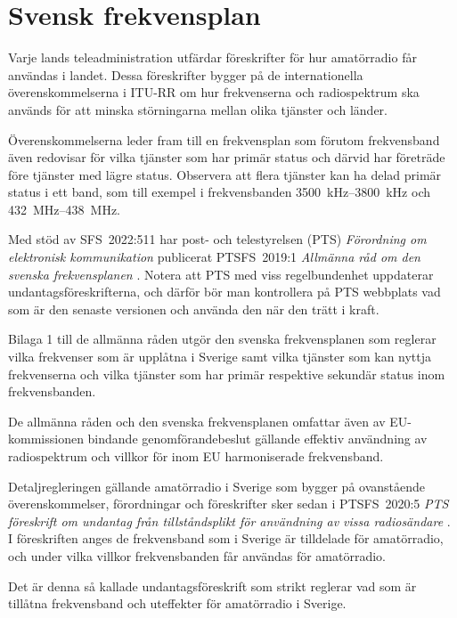 \chapter{Svensk frekvensplan}
\label{svensk frekvensplan}

Varje lands teleadministration utfärdar föreskrifter för hur amatörradio får
användas i landet.
Dessa föreskrifter bygger på de internationella överenskommelserna i ITU-RR
\cite[ARTICLE 5]{ITU-RR} om hur frekvenserna och radiospektrum ska används för
att minska störningarna mellan olika tjänster och länder.

Överenskommelserna leder fram till en frekvensplan som förutom frekvensband även
redovisar för vilka tjänster som har primär status och därvid har företräde före
tjänster med lägre status.
Observera att flera tjänster kan ha delad primär status i ett band, som till
exempel i frekvensbanden \SIrange{3500}{3800}{\kilo\hertz} och
\SIrange{432}{438}{\mega\hertz}.

Med stöd av SFS~2022:511 har post- och telestyrelsen (PTS)
\emph{Förordning om elektronisk kommunikation} \cite{SFS2022:511}
publicerat PTSFS~2019:1 \emph{Allmänna råd om den svenska frekvensplanen}
\cite{PTSFS2019:1}.
Notera att PTS med viss regelbundenhet uppdaterar undantagsföreskrifterna,
och därför bör man kontrollera på PTS webbplats vad som är den senaste versionen
och använda den när den trätt i kraft.

Bilaga 1 till de allmänna råden utgör den svenska frekvensplanen som reglerar
vilka frekvenser som är upplåtna i Sverige samt vilka tjänster som kan nyttja
frekvenserna och vilka tjänster som har primär respektive sekundär status inom
frekvensbanden.

\newpage

De allmänna råden och den svenska frekvensplanen omfattar även av
EU-kommissionen bindande genomförandebeslut gällande effektiv användning av
radiospektrum och villkor för inom EU harmoniserade frekvensband.

Detaljregleringen gällande amatörradio i Sverige som bygger på ovanstående
överenskommelser, förordningar och föreskrifter sker sedan i PTSFS~2020:5
\emph{PTS föreskrift om undantag från tillståndsplikt för användning av vissa
  radiosändare} \cite{PTSFS2022:19}.
I föreskriften anges de frekvensband som i Sverige är tilldelade för
amatörradio, och under vilka villkor frekvensbanden får användas för
amatörradio.

Det är denna så kallade undantagsföreskrift som strikt reglerar vad som är
tillåtna frekvensband och uteffekter för amatörradio i Sverige.

